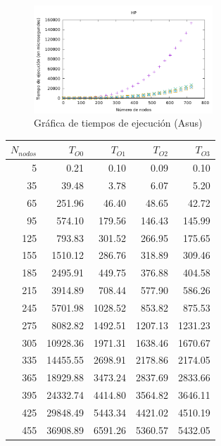 \documentclass{homework}
\begin{document}
    \begin{figure}[h]
        \centering
        \includegraphics[width=0.6\textwidth]{../data/asus-opt.pdf}
        \caption{Gráfica de tiempos de ejecución (Asus)}
    \end{figure}

    \begin{table}[h]
        \centering
        \begin{tabular}{|r|r|r|r|r|}
            \hline
            $N_{nodos}$ & $T_{O0}$ & $T_{O1}$ & $T_{O2}$ & $T_{O3}$ \\
            \hline
            5 & 0.21 & 0.10 & 0.09 & 0.10 \\ 
            35 & 39.48 & 3.78 & 6.07 & 5.20 \\ 
            65 & 251.96 & 46.40 & 48.65 & 42.72 \\ 
            95 & 574.10 & 179.56 & 146.43 & 145.99 \\ 
            125 & 793.83 & 301.52 & 266.95 & 175.65 \\ 
            155 & 1510.12 & 286.76 & 318.89 & 309.46 \\ 
            185 & 2495.91 & 449.75 & 376.88 & 404.58 \\ 
            215 & 3914.89 & 708.44 & 577.90 & 586.26 \\ 
            245 & 5701.98 & 1028.52 & 853.82 & 875.53 \\ 
            275 & 8082.82 & 1492.51 & 1207.13 & 1231.23 \\ 
            305 & 10928.36 & 1971.31 & 1638.46 & 1670.67 \\ 
            335 & 14455.55 & 2698.91 & 2178.86 & 2174.05 \\ 
            365 & 18929.88 & 3473.24 & 2837.69 & 2833.66 \\ 
            395 & 24332.74 & 4414.80 & 3564.82 & 3646.11 \\ 
            425 & 29848.49 & 5443.34 & 4421.02 & 4510.19 \\ 
            455 & 36908.89 & 6591.26 & 5360.57 & 5432.05 \\ 

\end{tabular}
\end{table}
\end{document}
